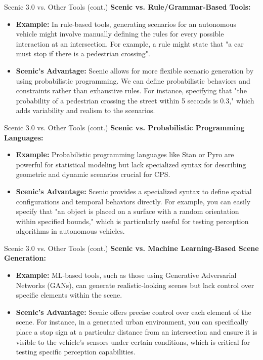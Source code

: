 \documentclass[10pt]{beamer}
\begin{document}
\begin{frame}{Scenic 3.0 vs. Other Tools (cont.)}
    \textbf{Scenic vs. Rule/Grammar-Based Tools:}\\
    \begin{itemize}
        \item \textbf{Example:} In rule-based tools, generating scenarios for an autonomous vehicle might involve manually defining the rules for every possible interaction at an intersection. For example, a rule might state that "a car must stop if there is a pedestrian crossing".
        \item \textbf {Scenic's Advantage:} Scenic allows for more flexible scenario generation by using probabilistic programming. We can define probabilistic behaviors and constraints rather than exhaustive rules. For instance, specifying that "the probability of a pedestrian crossing the street within 5 seconds is 0.3," which adds variability and realism to the scenarios.
    \end{itemize}
\end{frame}

\begin{frame}{Scenic 3.0 vs. Other Tools (cont.)}
    \textbf{Scenic vs. Probabilistic Programming Languages:}\\
    \begin{itemize}
        \item \textbf{Example:} Probabilistic programming languages like Stan or Pyro are powerful for statistical modeling but lack specialized syntax for describing geometric and dynamic scenarios crucial for CPS.
        \item \textbf {Scenic's Advantage:} Scenic provides a specialized syntax to define spatial configurations and temporal behaviors directly. For example, you can easily specify that "an object is placed on a surface with a random orientation within specified bounds," which is particularly useful for testing perception algorithms in autonomous vehicles.
    \end{itemize}
\end{frame}

\begin{frame}{Scenic 3.0 vs. Other Tools (cont.)}
    \textbf{Scenic vs. Machine Learning-Based Scene Generation:}\\
    \begin{itemize}
        \item \textbf{Example:} ML-based tools, such as those using Generative Adversarial Networks (GANs), can generate realistic-looking scenes but lack control over specific elements within the scene.
        \item \textbf {Scenic's Advantage:} Scenic offers precise control over each element of the scene. For instance, in a generated urban environment, you can specifically place a stop sign at a particular distance from an intersection and ensure it is visible to the vehicle's sensors under certain conditions, which is critical for testing specific perception capabilities.
    \end{itemize}
\end{frame}
\end{document}
